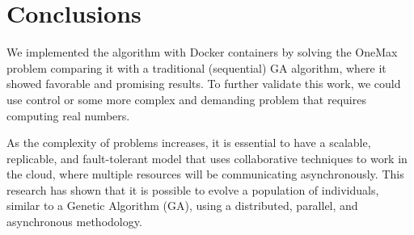 \documentclass[runningheads]{llncs}
\begin{document}
\section{Conclusions}

We implemented the algorithm with Docker containers by solving the OneMax
problem comparing it with a traditional (sequential) GA algorithm, where it
showed favorable and promising results. To further validate this work, we could
use control or some more complex and demanding problem that requires computing
real numbers.

As the complexity of problems increases, it is essential to have a scalable,
replicable, and fault-tolerant model that uses collaborative techniques to work
in the cloud, where multiple resources will be communicating asynchronously.
This research has shown that it is possible to evolve a population of
individuals, similar to a Genetic Algorithm (GA), using a distributed,
parallel, and asynchronous methodology.


%
%
%



% 



%
%
%


%
\end{document}
